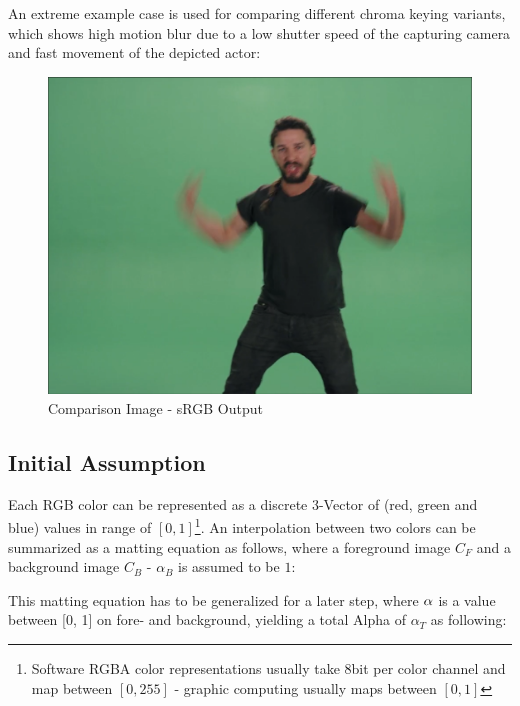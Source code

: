 An extreme example case is used for comparing different chroma keying variants, 
which shows high motion blur due to a low shutter speed of the capturing 
camera and fast movement of the depicted actor:

\begin{figure}[htb]
	\includegraphics[width=\textwidth]{gfx/distances/example.png}
	\caption{Comparison Image \cite{vimeo:shia:2015} - sRGB Output}
	\label{fig:chroma:color}
\end{figure}

\subsection{Initial Assumption}

Each RGB color can be represented as a discrete 3-Vector of (red, green and 
blue)  values in range of $[0, 1]$\footnote{Software RGBA color representations 
usually take 8bit per color channel and map between $[0, 255]$ - graphic 
computing usually maps between $[0, 1]$}. An interpolation between two colors 
can be summarized as a matting equation as follows, where a foreground image 
$C_F$ and a background image $C_B$ - $\alpha_B$ is assumed to be $1$:


This matting equation has to be generalized for a later step, where 
$\protect\alpha$ is a value between [0, 1] on fore- and background, yielding a 
total Alpha of $\alpha_T$ as following:


